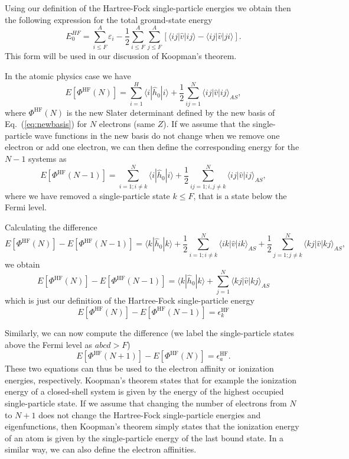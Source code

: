 \documentclass[%
oneside,                 %
final,                   %
10pt]{article}
\begin{document}
Using our definition of the Hartree-Fock single-particle energies we obtain then the following expression for the total ground-state energy
\[
  E_0^{HF}
  = \sum_{i\le F}^A \varepsilon_i - \frac{1}{2}\sum_{i\le F}^A\sum_{j \le F}^A\left[\langle ij |\hat{v}|ij \rangle-\langle ij|\hat{v}|ji\rangle\right].
\]
This form will be used in our discussion of Koopman's theorem.

In the   atomic physics case we have 
\[
  E[\Phi^{\mathrm{HF}}(N)] 
  = \sum_{i=1}^H \langle i | \hat{h}_0 | i \rangle +
  \frac{1}{2}\sum_{ij=1}^N\langle ij|\hat{v}|ij\rangle_{AS},
\]
where $\Phi^{\mathrm{HF}}(N)$ is the new Slater determinant defined by the new basis of Eq.~(\ref{eq:newbasis})
for $N$ electrons (same $Z$).  If we assume that the single-particle wave functions in the new basis do not change 
when we remove one electron or add one electron, we can then define the corresponding energy for the $N-1$ systems as 
\[
  E[\Phi^{\mathrm{HF}}(N-1)] 
  = \sum_{i=1; i\ne k}^N \langle i | \hat{h}_0 | i \rangle +
  \frac{1}{2}\sum_{ij=1;i,j\ne k}^N\langle ij|\hat{v}|ij\rangle_{AS},
\]
where we have removed a single-particle state $k\le F$, that is a state below the Fermi level.  

Calculating the difference 
\[
  E[\Phi^{\mathrm{HF}}(N)]-   E[\Phi^{\mathrm{HF}}(N-1)] = \langle k | \hat{h}_0 | k \rangle +
  \frac{1}{2}\sum_{i=1;i\ne k}^N\langle ik|\hat{v}|ik\rangle_{AS} + \frac{1}{2}\sum_{j=1;j\ne k}^N\langle kj|\hat{v}|kj\rangle_{AS},
\]
we obtain
\[
  E[\Phi^{\mathrm{HF}}(N)]-   E[\Phi^{\mathrm{HF}}(N-1)] = \langle k | \hat{h}_0 | k \rangle +\sum_{j=1}^N\langle kj|\hat{v}|kj\rangle_{AS}
\]
which is just our definition of the Hartree-Fock single-particle energy
\[
  E[\Phi^{\mathrm{HF}}(N)]-   E[\Phi^{\mathrm{HF}}(N-1)] = \epsilon_k^{\mathrm{HF}} 
\]

Similarly, we can now compute the difference (we label the single-particle states above the Fermi level as $abcd > F$)
\[
  E[\Phi^{\mathrm{HF}}(N+1)]-   E[\Phi^{\mathrm{HF}}(N)]= \epsilon_a^{\mathrm{HF}}. 
\]
These two equations can thus be used to the electron affinity or ionization energies, respectively. 
Koopman's theorem states that for example the ionization energy of a closed-shell system is given by the energy of the highest occupied single-particle state.  If we assume that changing the number of electrons from $N$ to $N+1$ does not change the Hartree-Fock single-particle energies and eigenfunctions, then Koopman's theorem simply states that the ionization energy of an atom is given by the single-particle energy of the last bound state. In a similar way, we can also define the electron affinities. 
\end{document}
